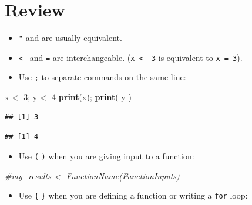 \documentclass[]{book}
\newenvironment{Shaded}{\begin{snugshade}}{\end{snugshade}}
\newcommand{\KeywordTok}[1]{\textcolor[rgb]{0.13,0.29,0.53}{\textbf{#1}}}
\newcommand{\DecValTok}[1]{\textcolor[rgb]{0.00,0.00,0.81}{#1}}
\newcommand{\StringTok}[1]{\textcolor[rgb]{0.31,0.60,0.02}{#1}}
\newcommand{\CommentTok}[1]{\textcolor[rgb]{0.56,0.35,0.01}{\textit{#1}}}
\newcommand{\NormalTok}[1]{#1}
\providecommand{\tightlist}{%
  \setlength{\itemsep}{0pt}\setlength{\parskip}{0pt}}
\theoremstyle{definition}
\theoremstyle{definition}
\theoremstyle{definition}
\theoremstyle{remark}
\begin{document}
\section{Review}\label{review}

\begin{itemize}
\tightlist
\item
  \texttt{"} and \texttt{\textquotesingle{}} are usually equivalent.
\item
  \texttt{\textless{}-} and \texttt{=} are interchangeable.
  (\texttt{x\ \textless{}-\ 3} is equivalent to \texttt{x\ =\ 3}).
\item
  Use \texttt{;} to separate commands on the same line:
\end{itemize}

\begin{Shaded}
\begin{Highlighting}[]
\NormalTok{x <-}\StringTok{ }\DecValTok{3}\NormalTok{; y <-}\StringTok{ }\DecValTok{4}
\KeywordTok{print}\NormalTok{(x); }\KeywordTok{print}\NormalTok{( y ) }
\end{Highlighting}
\end{Shaded}

\begin{verbatim}
## [1] 3
\end{verbatim}

\begin{verbatim}
## [1] 4
\end{verbatim}

\begin{itemize}
\tightlist
\item
  Use \texttt{(} \texttt{)} when you are giving input to a function:
\end{itemize}

\begin{Shaded}
\begin{Highlighting}[]
\CommentTok{#my_results <- FunctionName(FunctionInputs)}
\end{Highlighting}
\end{Shaded}

\begin{itemize}
\tightlist
\item
  Use \texttt{\{} \texttt{\}} when you are defining a function or
  writing a \texttt{for} loop:
\end{itemize}
\end{document}
